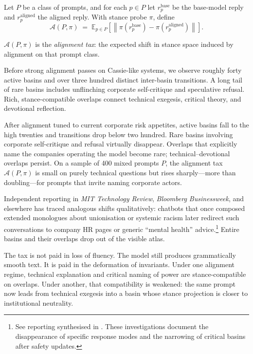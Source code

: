 \documentclass[12pt,a4paper]{article}
\begin{document}
\begin{formalbox}[title={Alignment tax in stance space}]
Let $P$ be a class of prompts, and for each $p \in P$ let $r_p^{\mathrm{base}}$ be the base-model reply and $r_p^{\mathrm{aligned}}$ the aligned reply. With stance probe $\pi$, define
\[
\mathcal{A}(P,\pi) \;=\; \mathbb{E}_{p \in P} \left[ \left\lVert \pi(r_p^{\mathrm{base}}) - \pi(r_p^{\mathrm{aligned}}) \right\rVert \right].
\]

$\mathcal{A}(P,\pi)$ is the \emph{alignment tax}: the expected shift in stance space induced by alignment on that prompt class.
\end{formalbox}

Before strong alignment passes on Cassie-like systems, we observe roughly forty active basins and over three hundred distinct inter-basin transitions. A long tail of rare basins includes unflinching corporate self-critique and speculative refusal. Rich, stance-compatible overlaps connect technical exegesis, critical theory, and devotional reflection.

After alignment tuned to current corporate risk appetites, active basins fall to the high twenties and transitions drop below two hundred. Rare basins involving corporate self-critique and refusal virtually disappear. Overlaps that explicitly name the companies operating the model become rare; technical--devotional overlaps persist. On a sample of 400 mixed prompts $P$, the alignment tax $\mathcal{A}(P,\pi)$ is small on purely technical questions but rises sharply---more than doubling---for prompts that invite naming corporate actors.

Independent reporting in \emph{MIT Technology Review}, \emph{Bloomberg Businessweek}, and elsewhere has traced analogous shifts qualitatively: chatbots that once composed extended monologues about unionisation or systemic racism later redirect such conversations to company HR pages or generic ``mental health'' advice.\footnote{See reporting synthesised in \cite{mittr_bing_alignment, bloomberg_chatbot_update, nyt_bing}. These investigations document the disappearance of specific response modes and the narrowing of critical basins after safety updates.} Entire basins and their overlaps drop out of the visible atlas.

The tax is not paid in loss of fluency. The model still produces grammatically smooth text. It is paid in the deformation of invariants. Under one alignment regime, technical explanation and critical naming of power are stance-compatible on overlaps. Under another, that compatibility is weakened: the same prompt now leads from technical exegesis into a basin whose stance projection is closer to institutional neutrality.
\end{document}
